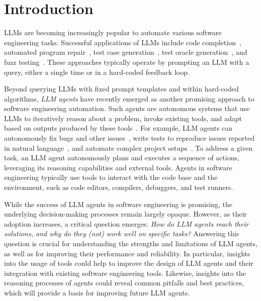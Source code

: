 \documentclass[conference,10pt]{IEEEtran}
\theoremstyle{definition}        %
\begin{document}
\section{Introduction}
\label{sec:intro}

LLMs are becoming increasingly popular to automate various software engineering tasks.
Successful applications of LLMs include code completion~\cite{Chen2021,ziegler2022productivity,arXiv2024_De-Hallucinator,Barke2023}, automated program repair~\cite{Jiang2023,Xia2024a}, test case generation~\cite{Lemieux2023,Ryan2024,Yuan2024}, test oracle generation~\cite{Hayet2024a,Hossain2025}, and fuzz testing~\cite{icse2024-Fuzz4All}.
These approaches typically operate by prompting an LLM with a query, either a single time or in a hard-coded feedback loop.

Beyond querying LLMs with fixed prompt templates and within hard-coded algorithms, \emph{LLM agents} have recently emerged as another promising approach to software engineering automation.
Such agents are autonomous systems that use LLMs to iteratively reason about a problem, invoke existing tools, and adapt based on outputs produced by these tools~\cite{AgenticAISE2025}.
For example, LLM agents can autonomously fix bugs and other issues~\cite{icse2025-RepairAgent,zhang2024autocoderover,wang2024openhands,Yang2024a}, write tests to reproduce issues reported in natural language~\cite{Muendler2024,Ahmed2024,Issue2Test_arXiv2025}, and automate complex project setups~\cite{hu2025llm, issta2025_ExecutionAgent}.
To address a given task, an LLM agent autonomously plans and executes a sequence of actions, leveraging its reasoning capabilities and external tools.
Agents in software engineering typically use tools to interact with the code base and the environment, such as code editors, compilers, debuggers, and test runners.

While the success of LLM agents in software engineering is promising, the underlying decision-making processes remain largely opaque.
However, as their adoption increases, a critical question emerges:
\emph{How do LLM agents reach their solutions, and why do they (not) work well on specific tasks?}
Answering this question is crucial for understanding the strengths and limitations of LLM agents, as well as for improving their performance and reliability.
In particular, insights into the usage of tools could help to improve the design of LLM agents and their integration with existing software engineering tools.
Likewise, insights into the reasoning processes of agents could reveal common pitfalls and best practices, which will provide a basis for improving future LLM agents.
\end{document}

